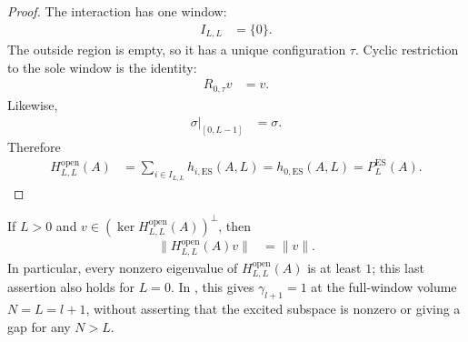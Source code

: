 \begin{proof}
    \leanok
    The interaction has one window:
    \begin{align}
        I_{L,L} & =\{0\}.
    \end{align}
    The outside region is empty, so it has a unique configuration $\tau$.
    Cyclic restriction to the sole window is the identity:
    \begin{align}
        R_{0,\tau}v & =v.
    \end{align}
    Likewise,
    \begin{align}
        \sigma|_{[0,L-1]} & =\sigma.
    \end{align}
    Therefore
    \begin{align}
        H^{\mathrm{open}}_{L,L}(A)
         & =\sum_{i\in I_{L,L}}h_{i,\mathrm{ES}}(A,L)
        =h_{0,\mathrm{ES}}(A,L)
        =P_L^{\mathrm{ES}}(A).
    \end{align}
\end{proof}

\begin{lemma}
    \label{thm:open_parent_hamiltonian_full_window_unit_gap}
    \leanok
    If $L>0$ and
    $v\in(\ker H^{\mathrm{open}}_{L,L}(A))^\perp$, then
    \begin{align}
        \lVert H^{\mathrm{open}}_{L,L}(A)v\rVert
         & =\lVert v\rVert.
        \label{eq:open_parent_hamiltonian_full_window_norm}
    \end{align}
    In particular, every nonzero eigenvalue of $H^{\mathrm{open}}_{L,L}(A)$
    is at least $1$; this last assertion also holds for $L=0$.
    In \cite[Theorem~2.1(i)]{Nachtergaele1996Spectral}, this gives
    $\gamma_{l+1}=1$ at the full-window volume $N=L=l+1$, without asserting
    that the excited subspace is nonzero or giving a gap for any $N>L$.
\end{lemma}

